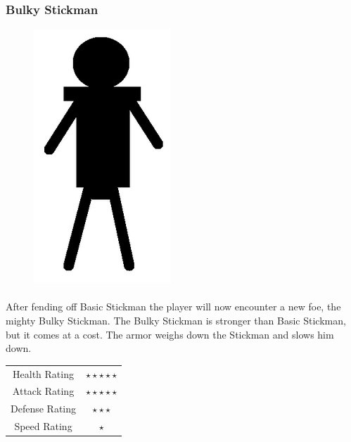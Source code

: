 \subsubsection{Bulky Stickman}

\begin{figure}[H]
	\centering
	\includegraphics{../images/castle-defense-bulky-stickman.png}
\end{figure}

\paragraph{} After fending off Basic Stickman the player will now encounter a new foe, the mighty Bulky Stickman. The Bulky Stickman is stronger than Basic Stickman, but it comes at a cost. The armor weighs down the Stickman and slows him down.

\begin{table}[H]
	\centering
	\begin{tabular}{c >{\(}c<{\)}}
		Health Rating	&	\star \star \star \star \star\\
		Attack Rating	&	\star \star \star \star \star\\
		Defense Rating	&	\star \star \star\\
		Speed Rating	&	\star
	\end{tabular}
\end{table}

